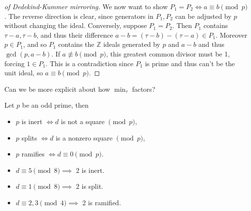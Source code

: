 \begin{proof}[of Dedekind-Kummer mirroring]
We now want to show \(P_1 = P_2 \iff a\equiv b \pmod p\). The reverse
direction is clear, since generators in \(P_1, P_2\) can be adjusted by
\(p\) without changing the ideal. Conversely, suppose \(P_1 = P_2\).
Then \(P_1\) contains \(\tau - a, \tau - b\), and thus their difference
\(a-b = (\tau -b ) - (\tau - a) \in P_1\). Moreover \(p\in P_1\), and so
\(P_1\) contains the \({\mathbb{Z}}\) ideals generated by \(p\) and
\(a-b\) and thus \(\gcd(p, a-b)\). If \(a \not\equiv b\pmod p\), this
greatest common divisor must be 1, forcing \(1\in P_1\). This is a
contradiction since \(P_1\) is prime and thus can't be the unit ideal,
so \(a \equiv b \pmod p\).

\end{proof}

\begin{question}

Can we be more explicit about how \(\min_\tau\) factors?

\end{question}

\begin{proposition}

Let \(p\) be an odd prime, then

\begin{itemize}
\tightlist
\item
  \(p\) is inert \(\iff d\) is not a square \(\pmod p\),
\item
  \(p\) splits \(\iff d\) is a nonzero square \(\pmod p\),
\item
  \(p\) ramifies \(\iff d \equiv 0 \pmod p\).
\end{itemize}

\end{proposition}

\begin{proposition}

\envlist

\begin{itemize}
\tightlist
\item
  \(d \equiv 5 \pmod 8 \implies\) 2 is inert.
\item
  \(d \equiv 1 \pmod 8 \implies\) 2 is split.
\item
  \(d \equiv 2, 3 \pmod 4 \implies\) 2 is ramified.
\end{itemize}

\end{proposition}

